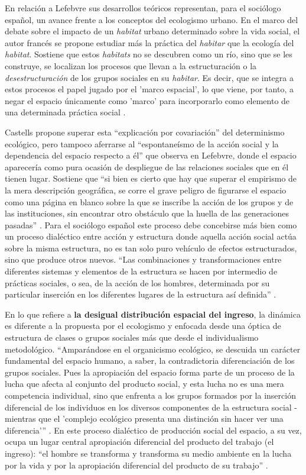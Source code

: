 En relación a Lefebvre sus desarrollos teóricos representan, para el sociólogo español, un avance frente a los conceptos del ecologismo urbano. En el marco del debate sobre el impacto de un \textit{habitat} urbano determinado sobre la vida social, el autor francés se propone estudiar más la práctica del \textit{habitar} que la ecología del \textit{habitat}. Sostiene que estos \textit{habitats} no se descubren como un río, sino que se les construye, se localizan los procesos que llevan a la estructuración o la \textit{desestructuración} de los grupos sociales en su \textit{habitar}. Es decir, que se integra a estos procesos el papel jugado por el 'marco espacial', lo que viene, por tanto, a negar el espacio únicamente como 'marco' para incorporarlo como elemento de una determinada práctica social \cite[~128]{castells}.

Castells propone superar esta “explicación por covariación” del determinismo ecológico, pero tampoco aferrarse al “espontaneísmo de la acción social y la dependencia del espacio respecto a él” que observa en Lefebvre, donde el espacio aparecería como pura ocasión de despliegue de las relaciones sociales que en él tienen lugar. Sostiene que “si bien es cierto que hay que superar el empirismo de la mera descripción geográfica, se corre el grave peligro de figurarse el espacio como una página en blanco sobre la que se inscribe la acción de los grupos y de las instituciones, sin encontrar otro obstáculo que la huella de las generaciones pasadas” \cite[~141]{castells}. Para el sociólogo español este proceso debe concebirse más bien como un proceso dialéctico entre acción y estructura donde aquella acción social actúa sobre la misma estructura, no es tan solo puro vehículo de efectos estructurados, sino que produce otros nuevos. “Las combinaciones y transformaciones entre diferentes sistemas y elementos de la estructura se hacen por intermedio de prácticas sociales, o sea, de la acción de los hombres, determinada por su particular inserción en los diferentes lugares de la estructura así definida” \cite[p.~154]{castells}. 

En lo que refiere a \textbf{la desigual distribución espacial del ingreso}, la dinámica es diferente a la propuesta por el ecologismo y enfocada desde una óptica de estructura de clases o grupos sociales más que desde el individualismo metodológico. “Amparándose en el organicismo ecológico, se descuida un carácter fundamental del espacio humano, a saber, la contradictoria diferenciación de los grupos sociales. Pues la apropiación del espacio forma parte de un proceso de la lucha que afecta al conjunto del producto social, y esta lucha no es una mera competencia individual, sino que enfrenta a los grupos formados por la inserción diferencial de los individuos en los diversos componentes de la estructura social -mientras que el 'complejo ecológico presenta una distinción sin hacer ver una diferencia'” \cite[p.~148]{castells}. En este proceso dialéctico de producción social del espacio, a su vez, ocupa un lugar central apropiación diferencial del producto del trabajo (el ingreso): “el hombre se transforma y transforma su medio ambiente en la lucha por la vida y por la apropiación diferencial del producto de su trabajo”  \cite[p.~141]{castells}.


